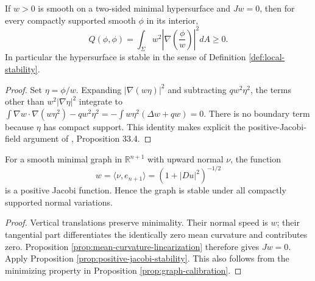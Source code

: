 \begin{proposition}\label{prop:positive-jacobi-stability}
If $w>0$ is smooth on a two-sided minimal hypersurface and $Jw=0$, then for every compactly supported smooth $\phi$ in its interior,
\[
 Q(\phi,\phi)=\int_\Sigma w^2\left|\nabla\left(\frac\phi w\right)\right|^2dA\geq0.
\]
In particular the hypersurface is stable in the sense of Definition \ref{def:local-stability}.
\end{proposition}
\begin{proof}
Set $\eta=\phi/w$. Expanding $|\nabla(w\eta)|^2$ and subtracting $q w^2\eta^2$, the terms other than $w^2|\nabla\eta|^2$ integrate to
$\int\nabla w\cdot\nabla(w\eta^2)-qw^2\eta^2=-\int w\eta^2(\Delta w+qw)=0$.
There is no boundary term because $\eta$ has compact support. This identity makes explicit the positive-Jacobi-field argument of \cite{ChMin}, Proposition 33.4.
\end{proof}

\begin{corollary}\label{cor:graph-positive-jacobi}
For a smooth minimal graph in $\mathbb R^{n+1}$ with upward normal $\nu$, the function
\[
 w=\langle\nu,e_{n+1}\rangle=(1+|Du|^2)^{-1/2}
\]
is a positive Jacobi function. Hence the graph is stable under all compactly supported normal variations.
\end{corollary}
\begin{proof}
Vertical translations preserve minimality. Their normal speed is $w$; their tangential part differentiates the identically zero mean curvature and contributes zero. Proposition \ref{prop:mean-curvature-linearization} therefore gives $Jw=0$. Apply Proposition \ref{prop:positive-jacobi-stability}. This also follows from the minimizing property in Proposition \ref{prop:graph-calibration}.
\end{proof}


